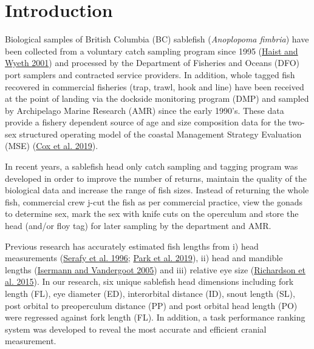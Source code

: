 \documentclass[12pt]{article}\usepackage[]{graphicx}\usepackage[]{color}
\begin{document}

\frontmatter


\renewcommand{\headrulewidth}{0.5pt}  %
\renewcommand{\footrulewidth}{0.5pt}  %

\newcommand{\lt}{\ensuremath <}
\newcommand{\gt}{\ensuremath >}

\newlength{\cslhangindent}
\setlength{\cslhangindent}{1.5em}
\newenvironment{cslreferences}%
  {}%
  {\par}

\hypertarget{introduction}{%
\section{Introduction}\label{introduction}}

Biological samples of British Columbia (BC) sablefish (\emph{Anoplopoma fimbria}) have been collected from a voluntary catch sampling program since 1995 (\protect\hyperlink{ref-Haist2001}{Haist and Wyeth 2001}) and processed by the Department of Fisheries and Oceans (DFO) port samplers and contracted service providers. In addition, whole tagged fish recovered in commercial fisheries (trap, trawl, hook and line) have been received at the point of landing via the dockside monitoring program (DMP) and sampled by Archipelago Marine Research (AMR) since the early 1990's. These data provide a fishery dependent source of age and size composition data for the two-sex structured operating model of the coastal Management Strategy Evaluation (MSE) (\protect\hyperlink{ref-Cox2019}{Cox et al. 2019}).

In recent years, a sablefish head only catch sampling and tagging program was developed in order to improve the number of returns, maintain the quality of the biological data and increase the range of fish sizes. Instead of returning the whole fish, commercial crew j-cut the fish as per commercial practice, view the gonads to determine sex, mark the sex with knife cuts on the operculum and store the head (and/or floy tag) for later sampling by the department and AMR.

Previous research has accurately estimated fish lengths from i) head measurements (\protect\hyperlink{ref-Serafy1996}{Serafy et al. 1996}; \protect\hyperlink{ref-Park2019}{Park et al. 2019}), ii) head and mandible lengths (\protect\hyperlink{ref-Isermann2005}{Isermann and Vandergoot 2005}) and iii) relative eye size (\protect\hyperlink{ref-Richardson2015}{Richardson et al. 2015}). In our research, six unique sablefish head dimensions including fork length (FL), eye diameter (ED), interorbital distance (ID), snout length (SL), post orbital to preoperculum distance (PP) and post orbital head length (PO) were regressed against fork length (FL). In addition, a task performance ranking system was developed to reveal the most accurate and efficient cranial measurement.
\end{document}
